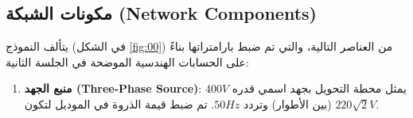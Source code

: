 \documentclass[12pt, a4paper, twoside]{article} %
\newcommand{\el}{\textenglish} %
\begin{document}
\subsection{مكونات الشبكة \el{(Network Components)}}
يتألف النموذج (في الشكل \ref{fig:00}) من العناصر التالية، والتي تم ضبط بارامتراتها بناءً على الحسابات الهندسية الموضحة في الجلسة الثانية:
\begin{enumerate}
  \item \textbf{منبع الجهد \el{(Three-Phase Source)}}:
  يمثل محطة التحويل بجهد اسمي قدره $400 V$ (بين الأطوار) وتردد $50 Hz$. تم ضبط قيمة الذروة في الموديل لتكون $220\sqrt{2} V$.\\[-10pt]
  \begin{center}
    \begin{LTR} %
      \begin{tikzpicture}
        

\end{tikzpicture}
\end{LTR}
\end{center}
\end{enumerate}
\end{document}
